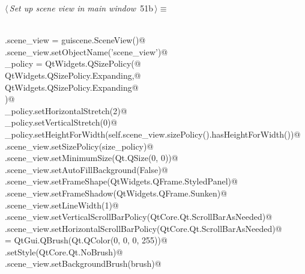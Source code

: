 \documentclass[
    a4paper,      %
    10pt,         %
    openright,    %
    notitlepage,  %
    parskip=half, %
]{scrreprt}       %
\theoremstyle{definition}                    %
\begin{document}
\begin{flushleft} \small
\begin{minipage}{\linewidth}\label{scrap74}\raggedright\small
{} $\langle\,${\itshape Set up scene view in main window}\nobreak\ {\footnotesize {51b}}$\,\rangle\equiv$
\vspace{-1exm}
\begin{list}{}{} \item
\mbox{}\lstinline@@\\
\mbox{}\lstinline@self.scene_view = guiscene.SceneView()@\\
\mbox{}\lstinline@self.scene_view.setObjectName('scene_view')@\\
\mbox{}\lstinline@size_policy = QtWidgets.QSizePolicy(@\\
\mbox{}\lstinline@    QtWidgets.QSizePolicy.Expanding,@\\
\mbox{}\lstinline@    QtWidgets.QSizePolicy.Expanding@\\
\mbox{}\lstinline@)@\\
\mbox{}\lstinline@size_policy.setHorizontalStretch(2)@\\
\mbox{}\lstinline@size_policy.setVerticalStretch(0)@\\
\mbox{}\lstinline@size_policy.setHeightForWidth(self.scene_view.sizePolicy().hasHeightForWidth())@\\
\mbox{}\lstinline@self.scene_view.setSizePolicy(size_policy)@\\
\mbox{}\lstinline@self.scene_view.setMinimumSize(Qt.QSize(0, 0))@\\
\mbox{}\lstinline@self.scene_view.setAutoFillBackground(False)@\\
\mbox{}\lstinline@self.scene_view.setFrameShape(QtWidgets.QFrame.StyledPanel)@\\
\mbox{}\lstinline@self.scene_view.setFrameShadow(QtWidgets.QFrame.Sunken)@\\
\mbox{}\lstinline@self.scene_view.setLineWidth(1)@\\
\mbox{}\lstinline@self.scene_view.setVerticalScrollBarPolicy(QtCore.Qt.ScrollBarAsNeeded)@\\
\mbox{}\lstinline@self.scene_view.setHorizontalScrollBarPolicy(QtCore.Qt.ScrollBarAsNeeded)@\\
\mbox{}\lstinline@brush = QtGui.QBrush(Qt.QColor(0, 0, 0, 255))@\\
\mbox{}\lstinline@brush.setStyle(QtCore.Qt.NoBrush)@\\
\mbox{}\lstinline@self.scene_view.setBackgroundBrush(brush)@\\

\end{list}
\end{minipage}
\end{flushleft}
\end{document}
